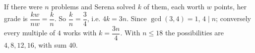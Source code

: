 If there were $n$ problems and Serena solved $k$ of them, each worth $w$ points, her grade is $\dfrac{kw}{nw}=\dfrac kn$. So $\dfrac kn=\dfrac34$, i.e. $4k=3n$. Since $\gcd(3,4)=1$, $4\mid n$; conversely every multiple of $4$ works with $k=\dfrac{3n}{4}$. With $n\le18$ the possibilities are $4,8,12,16$, with sum $\boxed{40}$.
